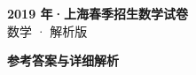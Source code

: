 \documentclass[zihao=-4, a4paper]{ctexart}
\begin{document}
\begin{center}
  {\Large\bfseries 2019 年·上海春季招生数学试卷}\\[4pt]
  {\large 数学 · 解析版}
\end{center}
\medskip
{}

\clearpage
{}
\begin{center}{\Large\bfseries 参考答案与详细解析}\end{center}
\medskip

\end{document}
